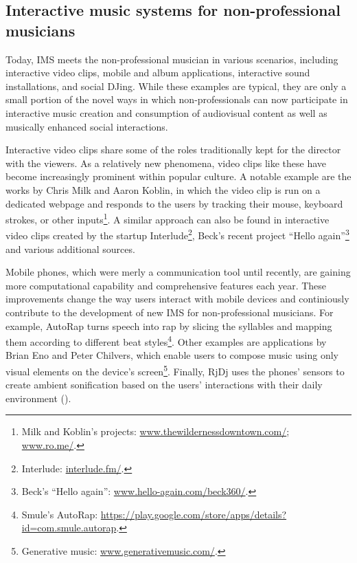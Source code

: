 \documentclass[a4paper,11pt]{article}
\begin{document}

\subsection{Interactive music systems for non-professional musicians}

Today, IMS meets the non-professional musician in various scenarios, including interactive video clips, mobile and album applications, interactive sound installations, and social DJing.
While these examples are typical, they are only a small portion of the novel ways in which non-professionals can now participate in interactive music creation and consumption of audiovisual content as well as musically enhanced social interactions.

Interactive video clips share some of the roles traditionally kept for the director with the viewers.
As a relatively new phenomena, video clips like these have become increasingly prominent within popular culture.
A notable example are the works by Chris Milk and Aaron Koblin, in which the video clip is run on a dedicated webpage and responds to the users by tracking their mouse, keyboard strokes, or other inputs\footnote{Milk and Koblin's projects: \href{http://www.thewildernessdowntown.com/}{www.thewildernessdowntown.com/}; \href{http://www.ro.me/}{www.ro.me/}.}.
A similar approach can also be found in interactive video clips created by the startup Interlude\footnote{Interlude: \href{http://interlude.fm/}{interlude.fm/}.}, Beck's recent project ``Hello again''\footnote{Beck's ``Hello again'': \href{http://www.hello-again.com/beck360/}{www.hello-again.com/beck360/}.} and various additional sources.

Mobile phones, which were merly a communication tool until recently, are gaining more computational capability and comprehensive features each year.
These improvements change the way users interact with mobile devices and continiously contribute to the development of new IMS for non-professional musicians.
For example, AutoRap turns speech into rap by slicing the syllables and mapping them according to different beat styles\footnote{Smule's AutoRap: \href{https://play.google.com/store/apps/details?id=com.smule.autorap}{https://play.google.com/store/apps/details?id=com.smule.autorap}.}.
Other examples are applications by Brian Eno and Peter Chilvers, which enable users to compose music using only visual elements on the device's screen\footnote{Generative music: \href{http://www.generativemusic.com/}{www.generativemusic.com/}.}.
Finally, RjDj uses the phones' sensors to create ambient sonification based on the users' interactions with their daily environment (\cite{web:rjdj})\label{rjdj}.
\end{document}
